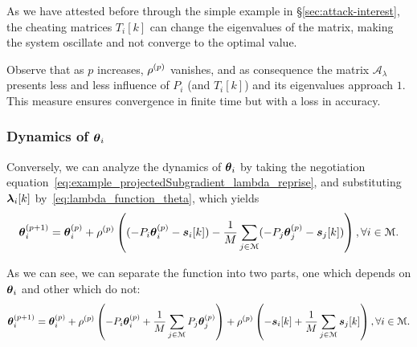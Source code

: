 \documentclass[../main.tex]{subfiles}
\begin{document}
As we have attested before through the simple example in \S\ref{sec:attack-interest}, the cheating matrices $T_{i}[k]$ can change the eigenvalues of the matrix, making the system oscillate and not converge to the optimal value.

\begin{remark}
  Observe that as $p$ increases, $\rho^{(p)}$ vanishes, and as consequence the matrix $\mathcal{A}_{\lambda}$ presents less and less influence of $P_{i}$ (and $T_i[k]$) and its eigenvalues approach $1$.
  This measure ensures convergence in finite time but with a loss in accuracy.
\end{remark}


\subsubsection{Dynamics of $\boldsymbol{\theta}_i$}
Conversely, we can analyze the dynamics of $\boldsymbol{\theta}_i$ by
taking the negotiation equation~\eqref{eq:example_projectedSubgradient_lambda_reprise},
and substituting $\lambdaik$ by~\eqref{eq:lambda_function_theta}, which yields
\begin{equation}
  \label{eq:negotiation_equation_substituting}
 \boldsymbol{\theta}_i^{(p+1)}=\boldsymbol{\theta}_i^{(p)}+\rho^{(p)}\left((-P_{i}\boldsymbol{\theta}_i^{(p)}-\boldsymbol{s}_{i}[k])-\frac{1}{M}\sum_{j\in\mathcal{M}}(-P_{j}\boldsymbol{\theta}_{j}^{(p)}-\boldsymbol{s}_{j}[k])\right),\forall i\in\mathcal{M}.
\end{equation}

As we can see, we can separate the function into two parts, one which depends on $\boldsymbol{\theta}_i$ and other which do not:
\begin{equation}
  \label{eq:negotiation_equation_substituting_organizing}
 \boldsymbol{\theta}_i^{(p+1)}=\boldsymbol{\theta}_i^{(p)}+\rho^{(p)}\left(-P_{i}\boldsymbol{\theta}_i^{(p)}+\frac{1}{M}\sum_{j\in\mathcal{M}}P_{j}\boldsymbol{\theta}_{j}^{(p)}\right)+\rho^{(p)}\left(-\boldsymbol{s}_{i}[k]+\frac{1}{M}\sum_{j\in\mathcal{M}}\boldsymbol{s}_{j}[k]\right),\forall i\in\mathcal{M}.
\end{equation}
\end{document}

